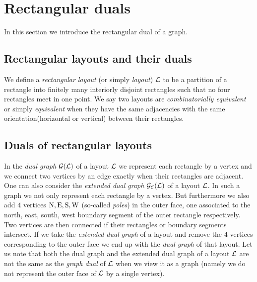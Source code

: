 
\section{Rectangular duals}


\newcommand{\G}{\scr G}
\renewcommand{\L}{\scr L}

In this section we  introduce the rectangular dual of a graph.

\subsection{Rectangular layouts and their duals}
  We define a \emph{rectangular layout} (or simply \emph{layout}) $\L$ to be a partition of a rectangle into finitely many interiorly disjoint rectangles such that no four rectangles meet in one point.
  We say two layouts are  \emph{combinatorially equivalent} or simply \emph{equivalent} when they have the same adjacencies with the same orientation(horizontal or vertical) between their rectangles.

\subsection{Duals of rectangular layouts}
  In the \emph{dual graph} $\dualgraph{\L}$ of a layout $\L$ we represent each rectangle by a vertex and we connect two vertices by an edge exactly when their rectangles are adjacent.
  One can also consider the \emph{extended dual graph} $\extdualgraph{\L}$ of a layout $\L$. In such a graph we not only represent each rectangle by a vertex. But furthermore we also add $4$ vertices $\mathrm{N}, \mathrm{E}, \mathrm{S}, \mathrm{W}$ (so-called \emph{poles}) in the outer face, one associated to the north, east, south, west boundary segment of the outer rectangle respectively. Two vertices are then connected if their rectangles or boundary segments intersect.
  If we take the \emph{extended dual graph} of a layout and remove the $4$ vertices corresponding to the outer face we end up with the \emph{dual graph} of that layout.
  Let us note that both the dual graph and the extended dual graph of a layout $\L$ are not the same as the \emph{graph dual} of $\L$ when we view it as a graph (namely we do not represent the outer face of $\L$ by a single vertex).

